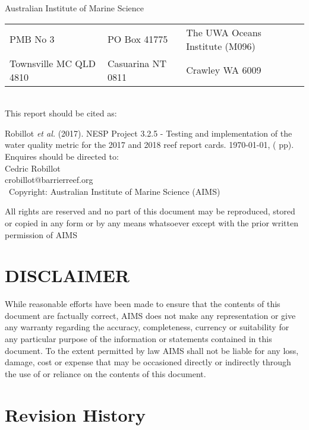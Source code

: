 \thispagestyle{firststyle}
Australian Institute of Marine Science\\
\begin{tabularx}{\linewidth}{llX}
PMB No 3                & PO Box 41775      & The UWA Oceans Institute (M096)\\
Townsville MC QLD 4810  & Casuarina NT 0811 & Crawley WA 6009\\
\end{tabularx}
\\[3em]

This report should be cited as:

Robillot \textit{et al.} (2017). NESP Project 3.2.5 - Testing and implementation of the water quality metric for the 2017 and 2018 reef report cards. \today, (\pageref{LastPage} pp).
~\\[1em]

Enquires should be directed to:\\[1em]
Cedric Robillot\\
crobillot@barrierreef.org  \\[2em]

\textcopyright~Copyright: Australian Institute of Marine Science (AIMS) \the\year

All rights are reserved and no part of this document may be reproduced, stored or copied in any form or by any means whatsoever except with the prior written permission of AIMS


\part*{DISCLAIMER}
While reasonable efforts have been made to ensure that the contents of this document are factually correct, AIMS does not make any representation or give any warranty regarding the accuracy, completeness, currency or suitability for any particular purpose of the information or statements contained in this document. To the extent permitted by law AIMS shall not be liable for any loss, damage, cost or expense that may be occasioned directly or indirectly through the use of or reliance on the contents of this document.


\part*{Revision History}

